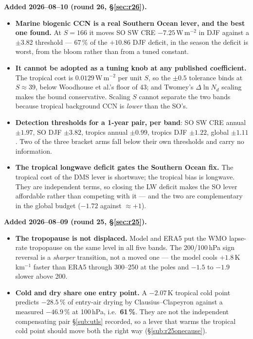 \documentclass[10pt]{article}
\begin{document}
\textbf{Added 2026--08--10 (round 26, \S\ref{sec:r26}).}
\begin{itemize}\itemsep2pt
\item \textbf{Marine biogenic CCN is a real Southern Ocean lever, and the best one found.}
At $S=166$ it moves SO SW CRE $-7.25$\,W\,m$^{-2}$ in DJF against a $\pm3.82$ threshold ---
$67\,\%$ of the $+10.86$ DJF deficit, in the season the deficit is worst, from the bloom
rather than from a tuned constant.
\item \textbf{It cannot be adopted as a tuning knob at any published coefficient.} The
tropical cost is $0.0129$\,W\,m$^{-2}$ per unit $S$, so the $\pm0.5$ tolerance binds at
$S\approx39$, below Woodhouse et al.'s floor of 43; and Twomey's $\Delta\ln N_d$ scaling
makes the bound conservative. Scaling $S$ cannot separate the two bands because tropical
background CCN is \emph{lower} than the SO's.
\item \textbf{Detection thresholds for a 1-year pair, per band}: SO SW CRE annual $\pm1.97$,
SO DJF $\pm3.82$, tropics annual $\pm0.99$, tropics DJF $\pm1.22$, global $\pm1.11$. Two of
the three bracket arms fall below their own thresholds and carry no information.
\item \textbf{The tropical longwave deficit gates the Southern Ocean fix.} The tropical cost
of the DMS lever is shortwave; the tropical bias is longwave. They are independent terms, so
closing the LW deficit makes the SO lever affordable rather than competing with it --- and
the two are complementary in the global budget ($-1.72$ against ${\approx}+1$).
\end{itemize}

\textbf{Added 2026--08--09 (round 25, \S\ref{sec:r25}).}
\begin{itemize}\itemsep2pt
\item \textbf{The tropopause is not displaced.} Model and ERA5 put the WMO lapse-rate
tropopause on the same level in all five bands. The 200/100\,hPa sign reversal is a
\emph{sharper} transition, not a moved one --- the model cools $+1.8$\,K\,km$^{-1}$ faster
than ERA5 through 300--250 at the poles and $-1.5$ to $-1.9$ slower above 200.
\item \textbf{Cold and dry share one entry point.} A $-2.07$\,K tropical cold point predicts
$-28.5\,\%$ of entry-air drying by Clausius--Clapeyron against a measured $-46.9\,\%$ at
100\,hPa, i.e.\ \textbf{61\,\%}. They are not the independent compensating pair
\S\ref{sub:utls} recorded, so a lever that warms the tropical cold point should move both
the right way (\S\ref{sub:r25onecause}).
\end{itemize}
\end{document}
